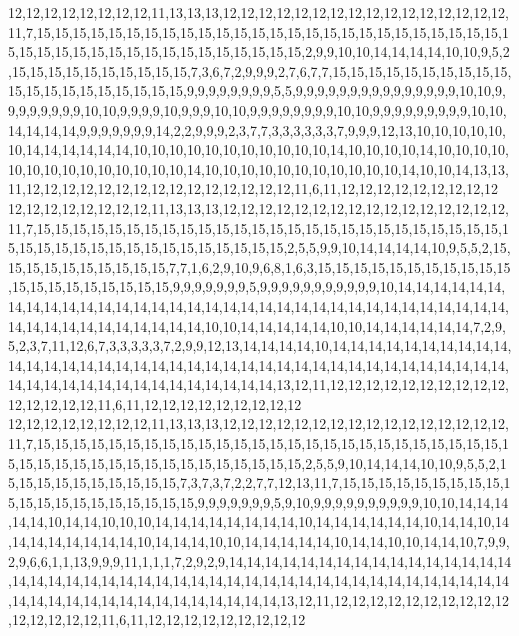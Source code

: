 12,12,12,12,12,12,12,12,11,13,13,13,12,12,12,12,12,12,12,12,12,12,12,12,12,12,12,12,11,7,15,15,15,15,15,15,15,15,15,15,15,15,15,15,15,15,15,15,15,15,15,15,15,15,15,15,15,15,15,15,15,15,15,15,15,15,15,15,15,15,15,15,15,2,9,9,10,10,14,14,14,14,10,10,9,5,2,15,15,15,15,15,15,15,15,15,15,7,3,6,7,2,9,9,9,2,7,6,7,7,15,15,15,15,15,15,15,15,15,15,15,15,15,15,15,15,15,15,15,15,9,9,9,9,9,9,9,9,5,5,9,9,9,9,9,9,9,9,9,9,9,9,9,9,9,10,10,9,9,9,9,9,9,9,9,10,10,9,9,9,9,10,9,9,9,10,10,9,9,9,9,9,9,9,9,10,10,9,9,9,9,9,9,9,9,9,10,10,14,14,14,14,9,9,9,9,9,9,9,14,2,2,9,9,9,2,3,7,7,3,3,3,3,3,3,7,9,9,9,12,13,10,10,10,10,10,10,14,14,14,14,14,14,10,10,10,10,10,10,10,10,10,10,10,14,10,10,10,10,14,10,10,10,10,10,10,10,10,10,10,10,10,10,10,14,10,10,10,10,10,10,10,10,10,10,10,14,10,10,14,13,13,11,12,12,12,12,12,12,12,12,12,12,12,12,12,12,12,11,6,11,12,12,12,12,12,12,12,12,12
12,12,12,12,12,12,12,12,11,13,13,13,12,12,12,12,12,12,12,12,12,12,12,12,12,12,12,12,11,7,15,15,15,15,15,15,15,15,15,15,15,15,15,15,15,15,15,15,15,15,15,15,15,15,15,15,15,15,15,15,15,15,15,15,15,15,15,15,15,15,15,15,2,5,5,9,9,10,14,14,14,14,10,9,5,5,2,15,15,15,15,15,15,15,15,15,15,7,7,1,6,2,9,10,9,6,8,1,6,3,15,15,15,15,15,15,15,15,15,15,15,15,15,15,15,15,15,15,15,15,9,9,9,9,9,9,9,5,9,9,9,9,9,9,9,9,9,9,9,10,14,14,14,14,14,14,14,14,14,14,14,14,14,14,14,14,14,14,14,14,14,14,14,14,14,14,14,14,14,14,14,14,14,14,14,14,14,14,14,14,14,14,14,14,14,10,10,14,14,14,14,14,10,10,14,14,14,14,14,14,7,2,9,5,2,3,7,11,12,6,7,3,3,3,3,3,7,2,9,9,12,13,14,14,14,14,10,14,14,14,14,14,14,14,14,14,14,14,14,14,14,14,14,14,14,14,14,14,14,14,14,14,14,14,14,14,14,14,14,14,14,14,14,14,14,14,14,14,14,14,14,14,14,14,14,14,14,14,14,14,13,12,11,12,12,12,12,12,12,12,12,12,12,12,12,12,12,12,11,6,11,12,12,12,12,12,12,12,12,12
12,12,12,12,12,12,12,12,11,13,13,13,12,12,12,12,12,12,12,12,12,12,12,12,12,12,12,12,11,7,15,15,15,15,15,15,15,15,15,15,15,15,15,15,15,15,15,15,15,15,15,15,15,15,15,15,15,15,15,15,15,15,15,15,15,15,15,15,15,15,15,15,15,2,5,5,9,10,14,14,14,10,10,9,5,5,2,15,15,15,15,15,15,15,15,15,15,7,3,7,3,7,2,2,7,7,12,13,11,7,15,15,15,15,15,15,15,15,15,15,15,15,15,15,15,15,15,15,15,15,9,9,9,9,9,9,9,5,9,10,9,9,9,9,9,9,9,9,9,9,10,10,14,14,14,14,14,10,14,14,10,10,10,14,14,14,14,14,14,14,14,10,14,14,14,14,14,14,10,14,14,10,14,14,14,14,14,14,14,14,10,14,14,14,10,10,14,14,14,14,14,10,14,14,10,10,14,14,10,7,9,9,2,9,6,6,1,1,13,9,9,9,11,1,1,1,7,2,9,2,9,14,14,14,14,14,14,14,14,14,14,14,14,14,14,14,14,14,14,14,14,14,14,14,14,14,14,14,14,14,14,14,14,14,14,14,14,14,14,14,14,14,14,14,14,14,14,14,14,14,14,14,14,14,14,14,14,14,14,14,13,12,11,12,12,12,12,12,12,12,12,12,12,12,12,12,12,12,11,6,11,12,12,12,12,12,12,12,12,12
